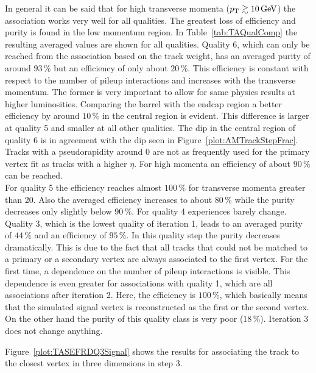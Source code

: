 In general it can be said that for high transverse momenta ($p_{\mathrm{T}}{}\gtrsim{}10\,\text{Ge\hspace{-.08em}V}{}$) the association works very well for all qualities. The greatest loss of efficiency and purity is found in the low momentum region. In Table~\ref{tab:TAQualComp} the resulting averaged values are shown for all qualities. Quality 6, which can only be reached from the association based on the track weight, has an averaged purity of around $93\,\%$ but an efficiency of only about $20\,\%$. This efficiency is constant with respect to the number of pileup interactions and increases with the transverse momentum. The former is very important to allow for same physics results at higher luminosities. Comparing the barrel with the endcap region a better efficiency by around $10\,\%$ in the central region is evident. This difference is larger at quality 5 and smaller at all other qualities. The dip in the central region of quality 6 is in agreement with the dip seen in Figure~\ref{plot:AMTrackStepFrac}. Tracks with a pseudorapidity around 0 are not as frequently used for the primary vertex fit as tracks with a higher $\eta{}$. For high momenta an efficiency of about $90\,\%$ can be reached. \\
For quality 5 the efficiency reaches almost $100\,\%$ for transverse momenta greater than 20\GeV. Also the averaged efficiency increases to about $80\,\%$  while the purity decreases only slightly below $90\,\%$. For quality 4 experiences barely change. Quality 3, which is the lowest quality of iteration 1, leads to an averaged purity of $44\,\%$ and an efficiency of $95\,\%$. In this quality step the purity decreases dramatically. This is due to the fact that all tracks that could not be matched to a primary or a secondary vertex are always associated to the first vertex. For the first time, a dependence on the number of pileup interactions is visible. This dependence is even greater for associations with quality 1, which are all associations after iteration 2. Here, the efficiency is $100\,\%$, which basically means that the simulated signal vertex is reconstructed as the first or the second vertex. On the other hand the purity of this quality class is very poor ($18\,\%$). Iteration 3 does not change anything.

Figure~\ref{plot:TASEFRDQ3Signal} shows the results for associating the track to the closest vertex in three dimensions in step 3.

